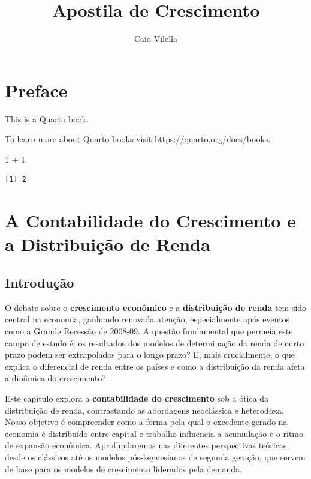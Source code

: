 \documentclass[
  brazilian,
  letterpaper,
  DIV=11,
  numbers=noendperiod]{scrreprt}
\title{Apostila de Crescimento}
\author{Caio Vilella}
\date{}
\newenvironment{Shaded}{\begin{snugshade}}{\end{snugshade}}
\newcommand{\DecValTok}[1]{\textcolor[rgb]{0.68,0.00,0.00}{#1}}
\newcommand{\SpecialCharTok}[1]{\textcolor[rgb]{0.37,0.37,0.37}{#1}}
\renewcommand*\contentsname{Índice}
\newcommand\contentsname{Índice}
\begin{document}
\maketitle

\renewcommand*\contentsname{Índice}
{
\setcounter{tocdepth}{2}
\tableofcontents
}


\chapter*{Preface}\label{preface}


This is a Quarto book.

To learn more about Quarto books visit
\url{https://quarto.org/docs/books}.

\begin{Shaded}
\begin{Highlighting}[]
\DecValTok{1} \SpecialCharTok{+} \DecValTok{1}
\end{Highlighting}
\end{Shaded}

\begin{verbatim}
[1] 2
\end{verbatim}


\chapter{A Contabilidade do Crescimento e a Distribuição de
Renda}\label{sec-contabilidade}

\section{Introdução}\label{introduuxe7uxe3o}

O debate sobre o \textbf{crescimento econômico} e a \textbf{distribuição
de renda} tem sido central na economia, ganhando renovada atenção,
especialmente após eventos como a Grande Recessão de 2008-09. A questão
fundamental que permeia este campo de estudo é: os resultados dos
modelos de determinação da renda de curto prazo podem ser extrapolados
para o longo prazo? E, mais crucialmente, o que explica o diferencial de
renda entre os países e como a distribuição da renda afeta a dinâmica do
crescimento?

Este capítulo explora a \textbf{contabilidade do crescimento} sob a
ótica da distribuição de renda, contrastando as abordagens neoclássica e
heterodoxa. Nosso objetivo é compreender como a forma pela qual o
excedente gerado na economia é distribuído entre capital e trabalho
influencia a acumulação e o ritmo de expansão econômica. Aprofundaremos
nas diferentes perspectivas teóricas, desde os clássicos até os modelos
pós-keynesianos de segunda geração, que servem de base para os modelos
de crescimento liderados pela demanda.
\end{document}
